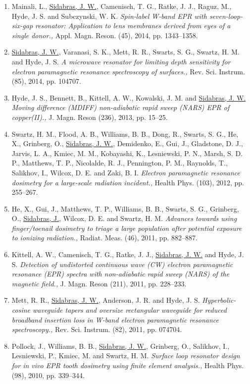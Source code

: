 \begin{enumerate}
    \item Mainali, L., \underline{Sidabras, J. W.}, Camenisch, T. G., Ratke, J. J., Raguz, M., Hyde, J. S. and Subczynski, W. K. \textit{Spin-label W-band EPR with seven-loop-six-gap resonator: Application to lens membranes derived from eyes of a single donor.,} Appl. Magn. Reson. (45), 2014, pp. 1343--1358.
    \item \underline{Sidabras, J. W.}, Varanasi, S. K., Mett, R. R., Swarts, S. G., Swartz, H. M. and Hyde, J. S. \textit{A microwave resonator for limiting depth sensitivity for electron paramagnetic resonance spectroscopy of surfaces.,} Rev. Sci. Instrum. (85), 2014, pp. 104707.
    \item Hyde, J. S., Bennett, B., Kittell, A. W., Kowalski, J. M. and \underline{Sidabras, J. W.} \textit{Moving difference (MDIFF) non-adiabatic rapid sweep (NARS) EPR of copper(II).,} J. Magn. Reson (236), 2013, pp. 15--25.
    \item Swartz, H. M., Flood, A. B., Williams, B. B., Dong, R., Swarts, S. G., He, X., Grinberg, O., \underline{Sidabras, J. W.}, Demidenko, E., Gui, J., Gladstone, D. J., Jarvis, L. A., Kmiec, M. M., Kobayashi, K., Lesniewski, P. N., Marsh, S. D. P., Matthews, T. P., Nicolalde, R. J., Pennington, P. M., Raynolds, T., Salikhov, I., Wilcox, D. E. and Zaki, B. I. \textit{Electron paramagnetic resonance dosimetry for a large-scale radiation incident.,} Health Phys. (103), 2012, pp. 255--267.
    \item He, X., Gui, J., Matthews, T. P., Williams, B. B., Swarts, S. G., Grinberg, O., \underline{Sidabras, J.}, Wilcox, D. E. and Swartz, H. M. \textit{Advances towards using finger/toenail dosimetry to triage a large population after potential exposure to ionizing radiation.,} Radiat. Meas. (46), 2011, pp. 882--887.
    \item Kittell, A. W., Camenisch, T. G., Ratke, J. J., \underline{Sidabras, J. W.} and Hyde, J. S. \textit{Detection of undistorted continuous wave (CW) electron paramagnetic resonance (EPR) spectra with non-adiabatic rapid sweep (NARS) of the magnetic field.,} J. Magn. Reson (211), 2011, pp. 228--233.
    \item Mett, R. R., \underline{Sidabras, J. W.}, Anderson, J. R. and Hyde, J. S. \textit{Hyperbolic-cosine waveguide tapers and oversize rectangular waveguide for reduced broadband insertion loss in W-band electron paramagnetic resonance spectroscopy.,} Rev. Sci. Instrum. (82), 2011, pp. 074704.
    \item Pollock, J., Williams, B. B., \underline{Sidabras, J. W.}, Grinberg, O., Salikhov, I., Lesniewski, P., Kmiec, M. and Swartz, H. M. \textit{Surface loop resonator design for in vivo EPR tooth dosimetry using finite element analysis.,} Health Phys. (98), 2010, pp. 339--344.

\end{enumerate}
